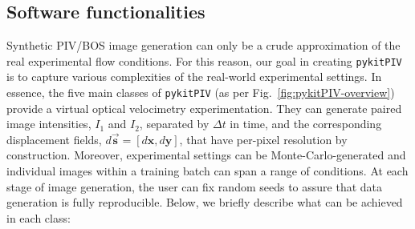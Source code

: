\documentclass[a4paper,fleqn]{cas-dc}
\begin{document}
\subsection{Software functionalities}

Synthetic PIV/BOS image generation can only be a crude approximation of the real experimental flow conditions. For this reason, our goal in creating \texttt{pykitPIV} is to capture various complexities of the real-world experimental settings. In essence, the five main classes of \texttt{pykitPIV} (as per Fig.~\ref{fig:pykitPIV-overview}) provide a virtual optical velocimetry experimentation. They can generate paired image intensities, $I_1$ and $I_2$, separated by $\Delta t$ in time, and the corresponding displacement fields, $d\vec{\mathbf{s}} = [d \mathbf{x}, d\mathbf{y}]$, that have per-pixel resolution by construction. Moreover, experimental settings can be Monte-Carlo-generated and individual images within a training batch can span a range of conditions. At each stage of image generation, the user can fix random seeds to assure that data generation is fully reproducible. Below, we briefly describe what can be achieved in each class:
\end{document}
